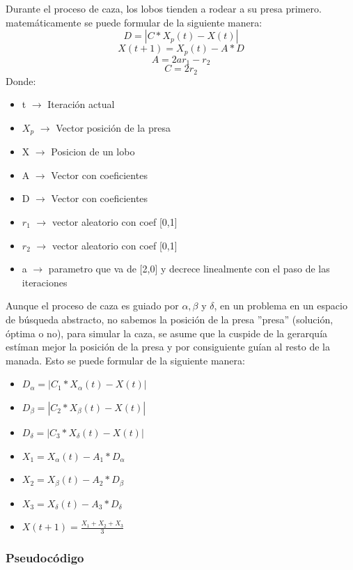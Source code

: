 \documentclass[a4paper, 12.5pt]{report}
\begin{document}
Durante el proceso de caza, los lobos tienden a rodear a su presa primero. matemáticamente se puede formular de la siguiente manera:
$$D=|C*X_p(t)-X(t)| $$
$$X(t+1)=X_p(t)-A*D$$
$$A=2ar_1-r_2$$
$$C=2r_2$$
Donde:
\begin{itemize}
	\item t $\rightarrow$ Iteración actual
	\item $X_p$ $\rightarrow$ Vector posición de la presa
	\item X $\rightarrow$ Posicion de un lobo
	\item A $\rightarrow$ Vector con coeficientes
	\item D $\rightarrow$ Vector con coeficientes
	\item $r_1$ $\rightarrow$ vector aleatorio con coef [0,1]
	\item $r_2$ $\rightarrow$ vector aleatorio con coef [0,1]
	\item a $\rightarrow$ parametro que va de [2,0] y decrece linealmente con el paso de las iteraciones
\end{itemize}

\newpage
Aunque el proceso de caza es guiado por $\alpha,\beta$ y $\delta$, en un problema en un espacio de búsqueda abstracto, no sabemos la posición de la presa ''presa'' (solución, óptima o no), para simular la caza, se asume que la cuspide de la gerarquía estíman mejor la posición de la presa y por consiguiente guían  al resto de la manada. Esto se puede formular de la siguiente manera:


\begin{itemize}
	\item $D_\alpha=|C_1*X_\alpha(t)-X(t)| $
	\item $D_\beta=|C_2*X_\beta(t)-X(t)| $
	\item $D_\delta=|C_3*X_\delta(t)-X(t)| $
	\item $X_1=X_\alpha(t)-A_1*D_\alpha$
	\item $X_2=X_\beta(t)-A_2*D_\beta$
	\item $X_3=X_\delta(t)-A_3*D_\delta$
	\item $X(t+1)=\frac{X_1+X_2+X_3}{3}$
\end{itemize}


\subsubsection*{Pseudocódigo}
\end{document}
